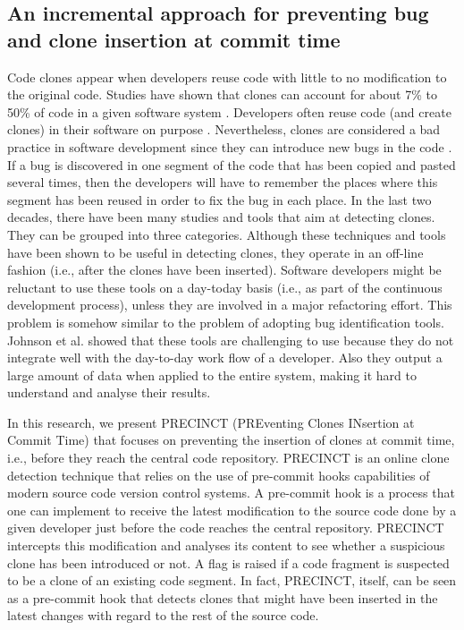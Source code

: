 \subsection{An incremental approach for preventing bug and clone insertion at commit time}

Code clones appear when developers reuse code with little to no modification to the original code.
Studies have shown that clones can account for about 7\% to 50\% of code in a given software system \cite{Baker, StephaneDucasse}. Developers often reuse code (and create clones) in their software on purpose \cite{Kim2005}.
Nevertheless, clones are considered a bad practice in software development since they can introduce new bugs in the code \cite{Kapser2006,Juergens2009,Li2006}. If a bug is discovered in one segment of the code that has been copied and pasted several times, then the developers will have to remember the places where this segment has been reused in order to fix the bug in each place. In the last two decades, there have been many studies and tools that aim at detecting clones.
They can be grouped into three categories. Although these techniques and tools have been shown to be useful in detecting clones, they operate in an off-line fashion (i.e., after the clones have been inserted). Software developers might be reluctant to use these tools on a day-today basis (i.e., as part of the continuous development process), unless they are involved in a major refactoring effort. This problem is somehow similar to the problem of adopting bug identification tools. Johnson et al. \cite{Johnson2013} showed that these tools are challenging to use because they do not integrate well with the day-to-day work flow of a developer. Also they output a large amount of data when applied to the entire system, making it hard to understand and analyse their results.

In this research, we present PRECINCT (PREventing Clones INsertion at Commit Time) that focuses on preventing the
insertion of clones at commit time, i.e., before they reach the central code repository.
PRECINCT is an online clone detection technique that relies on the use of pre-commit hooks capabilities of modern source code version control systems. A pre-commit hook is a process that one can implement to receive the latest modification to the source code done by a given developer just before the code reaches the central repository.
PRECINCT intercepts this modification and analyses its content to see whether a suspicious clone has been introduced
or not. A flag is raised if a code fragment is suspected to be a clone of an existing code segment.
In fact, PRECINCT, itself, can be seen as a pre-commit hook that detects clones that might have been inserted in the latest changes with regard to the rest of the source code.


